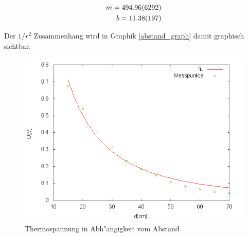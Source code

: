 	\begin{eqnarray*}
		m = \SI{494.96 (6292)}{}\\
		b = \SI{11.38 (1.97)}{}
	\end{eqnarray*}

	Der $1/r^2$ Zusammenhang wird in Graphik \eqref{abstand_graph} damit graphisch sichtbar.

	\begin{figure}[htbp]
		\centering
		\includegraphics[width = 12cm]{img/abstand.png}
		\caption{Thermospannung in Abh"angigkeit vom Abstand}
		\label{abstand_graph}
	\end{figure}

	
